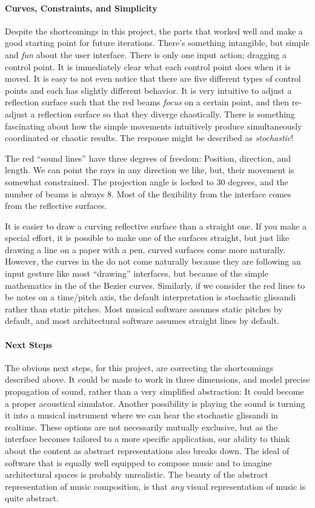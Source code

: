 \paragraph{Curves, Constraints, and Simplicity} Despite the
shortcomings in this project, the parts that worked well and make a
good starting point for future iterations. There's something
intangible, but simple and \textit{fun} about the user
interface. There is only one input action; dragging a control
point. It is immediately clear what each control point does when it is
moved. It is easy to not even notice that there are five different
types of control points and each has slightly different behavior. It
is very intuitive to adjust a reflection surface such that the red
beams \textit{focus} on a certain point, and then re-adjust a
reflection surface so that they diverge chaotically. There is
something fascinating about how the simple movements intuitively
produce simultaneously coordinated or chaotic results. The response
might be described as \textit{stochastic}!

The red ``sound lines'' have three degrees of freedom: Position,
direction, and length. We can point the rays in any direction we like,
but, their movement is somewhat constrained.  The projection angle is
locked to 30 degrees, and the number of beams is always 8. Most of the
flexibility from the interface comes from the reflective surfaces.

It is easier to draw a curving reflective surface than a straight
one. If you make a special effort, it is possible to make one of the
surfaces straight, but just like drawing a line on a paper with a pen,
curved surfaces come more naturally. However, the curves in the  do not
come naturally because they are following an input gesture like most
``drawing'' interfaces, but because of the simple mathematics in the
of the Bezier curves. Similarly, if we consider the red lines to be
notes on a time/pitch axis, the default interpretation is stochastic
glissandi rather than static pitches. Most musical software assumes
static pitches by default, and most architectural software assumes
straight lines by default.

\paragraph{Next Steps}
The obvious next steps, for this project, are correcting the
shortcomings described above. It could be made to work in three
dimensions, and model precise propagation of sound, rather than a very
simplified abstraction: It could become a proper acoustical
simulator. Another possibility is playing the sound is turning it into
a musical instrument where we can hear the stochastic glissandi in
realtime. These options are not necessarily mutually exclusive, but as
the interface becomes tailored to a more specific application, our
ability to think about the content as abstract representations also
breaks down. The ideal of software that is equally well equipped to
compose music and to imagine architectural spaces is probably
unrealistic. The beauty of the abstract representation of music
composition, is that \textit{any} visual representation of music is
quite abstract.


